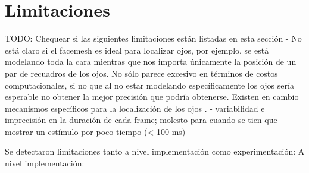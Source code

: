 \section{Limitaciones}

TODO: Chequear si las siguientes limitaciones están listadas en esta sección
- No está claro si el facemesh es ideal para localizar ojos, por ejemplo, se
está modelando toda la cara mientras que nos importa únicamente la posición de
un par de recuadros de los ojos.
No sólo parece excesivo en términos de costos computacionales, si no que al no
estar modelando específicamente los ojos sería esperable no obtener la mejor
precisión que podría obtenerse.
Existen en cambio mecanismos específicos para la localización de los ojos
\cite{hansen_2009_eye_of_the_beholder}.
- variabilidad e imprecisión en la duración de cada frame; molesto para cuando
se tien que mostrar un estímulo por poco tiempo (< 100 ms)



Se detectaron limitaciones tanto a nivel implementación como experimentación:
A nivel implementación: 

